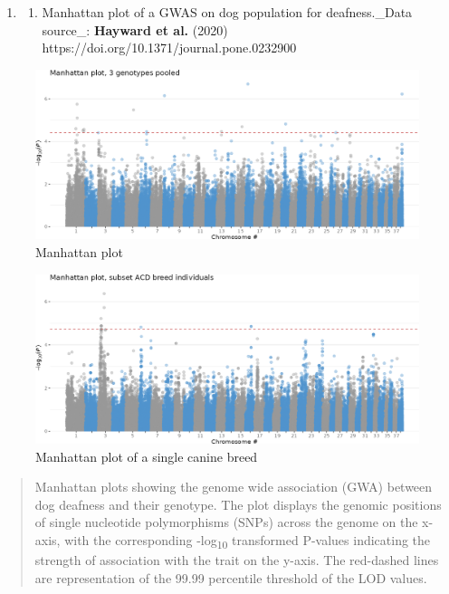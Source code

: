 \begin{enumerate}
  \def\labelenumi{\arabic{enumi}.}
  \item
        \begin{enumerate}
          \def\labelenumii{\alph{enumii}.}
          \tightlist
          \item
                Manhattan plot of a GWAS on dog population for deafness.\_Data
                source\_: \textbf{Hayward et al.} (2020)
                https://doi.org/10.1371/journal.pone.0232900
        \end{enumerate}
\end{enumerate}

\begin{figure}
  \centering
  \includegraphics[width=\linewidth]{Figures/manhattan_dogs.png}
  \caption{Manhattan plot}
\end{figure}

\begin{figure}
  \centering
  \includegraphics[width=\linewidth]{Figures/manhattan_filter_acd.png}
  \caption{Manhattan plot of a single canine breed}
\end{figure}

\begin{quote}
  Manhattan plots showing the genome wide association (GWA) between dog
  deafness and their genotype. The plot displays the genomic positions of
  single nucleotide polymorphisms (SNPs) across the genome on the x-axis,
  with the corresponding -log\textsubscript{10} transformed P-values
  indicating the strength of association with the trait on the y-axis. The
  red-dashed lines are representation of the 99.99 percentile threshold of
  the LOD values.
\end{quote}


